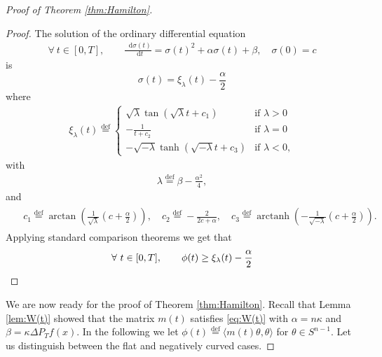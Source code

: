 \documentclass[a4paper,twoside,11pt,reqno]{amsart}
\newcommand{\eqdef}{\stackrel{\mathrm{def}}{=}}
\newcommand*\diff{\mathop{}\!\mathrm{d}}
\DeclareMathOperator{\arctanh}{arctanh}
\begin{document}
\begin{proof}[Proof of Theorem \ref{thm:Hamilton}]
\begin{proof}
The solution of the ordinary differential equation
\begin{align}\label{eq:tauODE}
\forall \ t\in [0,T],\qquad\frac{\diff \sigma(t)}{\diff t}= \sigma(t)^2+\alpha\sigma(t)+\beta , \quad\sigma(0)=c
\end{align}
is
\[
\sigma(t)= \xi_{\lambda}(t)-\frac{\alpha}{2}
\]
where 
\begin{align}\label{eq:xi}
\xi_{\lambda}(t)\eqdef
\begin{cases}
\sqrt{\lambda}\tan(\sqrt{\lambda}t+c_1) & \text{if }\lambda>0\\
-\frac{1}{t+c_2}& \text{if }\lambda=0\\
-\sqrt{-\lambda}\tanh(\sqrt{-\lambda}t+c_3)
 & \text{if }\lambda<0,
\end{cases}
\end{align}
with 
\begin{align}\label{eq:lambda}
\lambda\eqdef\beta-\frac{\alpha^2}{4}, 
\end{align}
and
\begin{align}\label{eq:c}
\begin{split}\quad c_1\eqdef\arctan\left(\frac{1}{\sqrt{\lambda}}\left(c+\frac{\alpha}{2}\right)\right),\quad c_2\eqdef-\frac{2}{2c+\alpha}, \quad c_3\eqdef\arctanh\left(-\frac{1}{\sqrt{-\lambda}}\left(c+\frac{\alpha}{2}\right)\right).
\end{split}
\end{align}
Applying standard comparison theorems \cite{Petrovitch} we get that
\begin{equation*}
\forall \ t\in[0,T], \qquad\phi(t)\ge \xi_{\lambda}(t)-\frac{\alpha}{2}\qedhere
\end{equation*}
\end{proof}
We are now ready for the proof of Theorem \ref{thm:Hamilton}. Recall that Lemma \ref{lem:W(t)} showed that the matrix $m(t)$ satisfies \eqref{eq:W(t)} with $\alpha=n\kappa$ and $\beta=\kappa\Delta P_Tf(x)$. In the following we let $\phi(t)\eqdef\langle m(t)\theta,\theta\rangle$ for $\theta\in S^{n-1}$. Let us distinguish between the flat and negatively curved cases. 


\end{proof}
\end{document}
